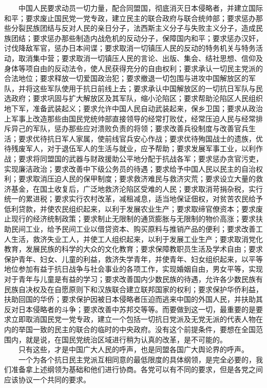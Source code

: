 \documentclass[cn,11pt,chinese]{elegantbook}
\begin{document}
　　中国人民要求动员一切力量，配合同盟国，彻底消灭日本侵略者，并建立国际和平；要求废止国民党一党专政，建立民主的联合政府与联合统帅部；要求惩办那些分裂民族团结与反对人民的亲日分子，法西斯主义分子与失败主义分子，造成民族团结；要求惩办那些制造内战危机的反动分子，保障国内和平；要求惩办汉奸，讨伐降敌军官，惩办日本间谍；要求取消一切镇压人民的反动的特务机关与特务活动，取消集中营；要求取消一切镇压人民的言论、出版、集会、结社思想、信仰及身体等项自由的反动法令，使人民获得充分的自由权利；要求承认一切民主党派的合法地位；要求释放一切爱国政治犯；要求撤退一切包围与进攻中国解放区的军队，并将这些军队使用于抗日前线上去；要求承认中国解放区的一切抗日军队与民选政府；要求巩固与扩大解放区及其军队，缩小沦陷区；要求帮助沦陷区人民组织地下军，准备武装起义；要求允许中国人民自动武装起来，保乡卫国；要求从政治上军事上改造那些由国民党统帅部直接领导的经常打败仗，经常压迫人民与经常排斥异己的军队，惩办那些应对溃败负责的将领；要求改善兵役制度与改善官兵生活；要求优待抗日军人家属，使前线官兵安心作战；要求优待殉国战士的遗族，优待残废军人，对于退伍军人的生活与就业，应予帮助；要求发展军事工业，以利作战；要求将同盟国的武器与财政援助公平地分配于抗战各军；要求惩办贪官污吏，实现廉洁政治；要求改善中下级公务员的待遇；要求给予中国人民以民主的自治权利；要求取消压迫人民的保甲制度；要求救济难民与救济灾荒；要求设立大量的救济基金，在国土收复后，广泛地救济沦陷区受难的人民；要求取消苛捐杂税，实行统一的累进税；要求实行农村改革，减租减息，适当地保证佃权，对贫苦农民给予低利贷款，并使农民组织起来，以利于发展农业生产；要求取缔官僚资本；要求废止现行的经济统制政策；要求制止无限制的通货膨胀与无限制的物价高涨；要求扶助民间工业，给予民间工业以借贷资本、购买原料与推销产品的便利；要求改善工人生活，救济失业工人，并使工人组织起来，以利于发展工业生产；要求取消党化教育，发展民族的科学的大众的文化教育；要求保障教职员生活及学术自由；要求保护青年、妇女、儿童的利益，救济失学青年，并使青年、妇女组织起来，以平等地位参加有益于抗日战争与社会事业的各项工作，实现婚姻自由，男女平等，实现对于青年与儿童是有益的学习；要求改善国内少数民族的待遇，允许各少数民族有民族自决权及在自愿原则下和汉族联合建立联邦国家的权利；要求保护华侨利益，扶助回国的华侨；要求保护因被日本侵略者压迫而逃来中国的外国人民，并扶助其反对日本侵略者的斗争；要求改善中苏邦交等等。而要做到这一切，最重要的是要求立即取消国民党一党专政，建立一个包括一切抗日党派及无党无派的代表人物在内的举国一致的民主的联合的临时的中央政府。没有这个前提条件，要想在全国范围内，就是说，在国民党统治区域进行稍为认真的改革，是不可能的。\\
　　只有这些，才是中国广大人民的呼声，也是同盟各国广大舆论界的呼声。\\
　　一个为各个抗日民主党派互相同意的最低限度的具体纲领，是完全必要的，我们准备拿上述纲领为基础和他们进行协商。各党可以有不同的要求，但是各党之间应该协议一个共同的要求。\\
\end{document}
